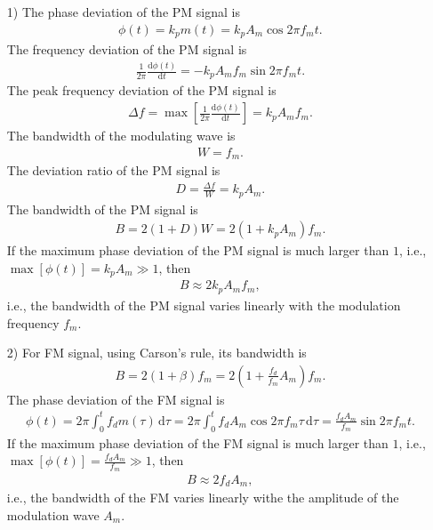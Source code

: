 \documentclass{assignment}
\begin{document}
\begin{sol}
    \begin{itemize}
        \item[1)] The phase deviation of the PM signal is
        \begin{align}
            \phi(t)=k_pm(t)=k_pA_m\cos 2\pi f_mt.
        \end{align}
        The frequency deviation of the PM signal is
        \begin{align}
            \frac{1}{2\pi}\frac{\mathrm{d}\phi(t)}{\mathrm{d}t}=-k_pA_mf_m\sin 2\pi f_mt.
        \end{align}
        The peak frequency deviation of the PM signal is
        \begin{align}
            \Delta f=\max\left[\frac{1}{2\pi}\frac{\mathrm{d}\phi(t)}{\mathrm{d}t}\right]=k_pA_mf_m.
        \end{align}
        The bandwidth of the modulating wave is
        \begin{align}
            W=f_m.
        \end{align}
        The deviation ratio of the PM signal is
        \begin{align}
            D=\frac{\Delta f}{W}=k_pA_m.
        \end{align}
        The bandwidth of the PM signal is
        \begin{align}
            B=2(1+D)W=2(1+k_pA_m)f_m.
        \end{align}
        If the maximum phase deviation of the PM signal is much larger than $1$, i.e., $\max\left[\phi(t)\right]=k_pA_m\gg 1$, then
        \begin{align}
            B\approx 2k_pA_mf_m,
        \end{align}
        i.e., the bandwidth of the PM signal varies linearly with the modulation frequency $f_m$.
        \item[2)] For FM signal, using Carson's rule, its bandwidth is
        \begin{align}
            B=2(1+\beta)f_m=2\left(1+\frac{f_d}{f_m}A_m\right)f_m.
        \end{align}
        The phase deviation of the FM signal is
        \begin{align}
            \phi(t)=2\pi\int_0^tf_dm(\tau)\,\mathrm{d}\tau=2\pi \int_0^tf_dA_m\cos 2\pi f_m\tau\,\mathrm{d}\tau=\frac{f_dA_m}{f_m}\sin 2\pi f_mt.
        \end{align}
        If the maximum phase deviation of the FM signal is much larger than $1$, i.e., $\max[\phi(t)]=\frac{f_dA_m}{f_m}\gg 1$, then
        \begin{align}
            B\approx 2f_dA_m,
        \end{align}
        i.e., the bandwidth of the FM varies linearly withe the amplitude of the modulation wave $A_m$.
    \end{itemize}
\end{sol}
\end{document}
